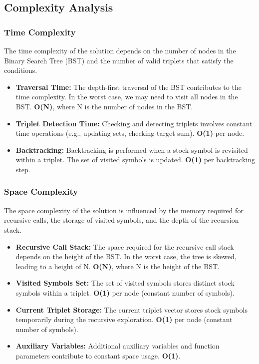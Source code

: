 \documentclass[11pt]{article}
\begin{document}
    \subsection{Complexity Analysis}
    \subsubsection{Time Complexity}
    The time complexity of the solution depends on the number of nodes in the Binary Search Tree (BST) and the number of valid triplets that satisfy the conditions.

    \begin{itemize}
        \item \textbf{Traversal Time:} The depth-first traversal of the BST contributes to the time complexity. In the worst case, we may need to visit all nodes in the BST. \textbf{O(N)}, where N is the number of nodes in the BST.
        \item \textbf{Triplet Detection Time:} Checking and detecting triplets involves constant time operations (e.g., updating sets, checking target sum). \textbf{O(1)} per node.
        \item \textbf{Backtracking:} Backtracking is performed when a stock symbol is revisited within a triplet. The set of visited symbols is updated. \textbf{O(1)} per backtracking step.
    \end{itemize}
    
    \subsubsection{Space Complexity}
    The space complexity of the solution is influenced by the memory required for recursive calls, the storage of visited symbols, and the depth of the recursion stack.

    \begin{itemize}
        \item \textbf{Recursive Call Stack:} The space required for the recursive call stack depends on the height of the BST. In the worst case, the tree is skewed, leading to a height of N. \textbf{O(N)}, where N is the height of the BST.
        \item \textbf{Visited Symbols Set:} The set of visited symbols stores distinct stock symbols within a triplet. \textbf{O(1)} per node (constant number of symbols).
        \item \textbf{Current Triplet Storage:} The current triplet vector stores stock symbols temporarily during the recursive exploration. \textbf{O(1)} per node (constant number of symbols).
        \item \textbf{Auxiliary Variables:} Additional auxiliary variables and function parameters contribute to constant space usage. \textbf{O(1)}.
    \end{itemize}
\end{document}
